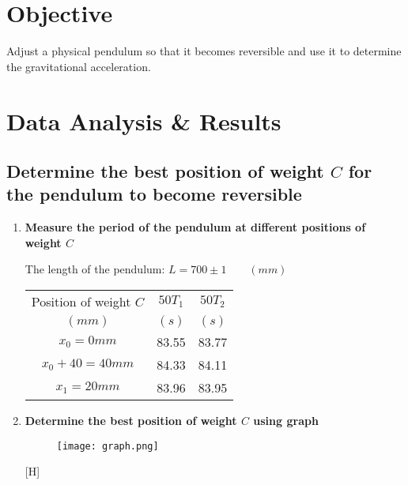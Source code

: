 \documentclass[12pt, a4paper]{article}
\newcommand{\hi}{\section}
\newcommand{\hiiBEGIN}[1]{\subsection{#1} \begin{enumerate}}
\newcommand{\hiiEND}{\end{enumerate}}
\newcommand{\hiii}{\item\textbf}
\begin{document}
\pagebreak

\hi{Objective}
    \par Adjust a physical pendulum so that it becomes reversible and use it to determine
    the gravitational acceleration.

\hi{Data Analysis \& Results}
    \hiiBEGIN{Determine the best position of weight $C$ for the pendulum to become reversible}
        \hiii{Measure the period of the pendulum at different positions of weight $C$}
            \par The length of the pendulum: $L = 700 \pm 1 \qquad (mm)$
            \begin{center}
                \begin{tabular}{|c|c|c|}
                    \hline
                    Position of weight $C$ & $50T_{1}$ & $50T_{2}$ \\
                    $(mm)$ & $(s)$ & $(s)$ \\
                    \hline
                    $x_{0} = 0 mm$       & 83.55 & 83.77 \\
                    \hline
                    $x_{0} + 40 = 40 mm$ & 84.33 & 84.11 \\
                    \hline
                    $x_{1} = 20 mm$      & 83.96 & 83.95 \\
                    \hline
                \end{tabular}
            \end{center}

        \hiii{Determine the best position of weight $C$ using graph}
            \begin{figure}[h]
                \begin{center}
                    \texttt{[image: graph.png]}
                \end{center}
            \end{figure}[H]

    \hiiEND
\end{document}
